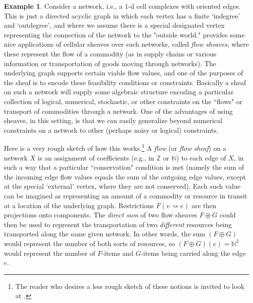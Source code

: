 \documentclass[a4paper]{book}
\theoremstyle{definition}
\newtheorem{example}{Example}[section]
\theoremstyle{definition}
\theoremstyle{definition}
\theoremstyle{theorem}
\theoremstyle{definition}
\begin{document}
\begin{example} 
Consider a network, i.e., a 1-d cell complexes with oriented edges. This is just a directed acyclic graph in which each vertex has a finite `indegree' and `outdegree', and where we assume there is a special designated vertex representing the connection of the network to the "outside world." \cite{ghrist_elementary_2014} provides some nice applications of cellular sheaves over such networks, called \textit{flow sheaves}, where these represent the flow of a commodity (as in supply chains or various information or transportation of goods moving through networks). The underlying graph supports certain viable flow values, and one of the purposes of the sheaf is to encode these feasibility conditions or constraints. Basically a sheaf on such a network will supply some algebraic structure encoding a particular collection of logical, numerical, stochastic, or other constraints on the ``flows" or transport of commodities through a network. One of the advantages of using sheaves, in this setting, is that we can easily generalize beyond numerical constraints on a network to other (perhaps noisy or logical) constraints. \par 
Here is a very rough sketch of how this works.\footnote{The reader who desires a less rough sketch of these notions is invited to look at \cite{ghrist_elementary_2014}.} A \textit{flow} (or \textit{flow sheaf}) on a network $X$ is an assignment of coefficients (e.g., in $\mathbb{Z}$ or $\mathbb{N}$) to each edge of $X$, in such a way that a particular ``conservation" condition is met (namely the sum of the incoming edge flow values equals the sum of the outgoing edge values, except at the special `external' vertex, where they are not conserved). Each such value can be imagined as representing an amount of a commodity or resource in transit at a location of the underlying graph. Restrictions $F(v \rightsquigarrow e)$ are then projections onto components. The \textit{direct sum} of two flow sheaves $F \oplus G$ could then be used to represent the transportation of two \textit{different} resources being transported along the same given network. In other words, the sum $(F \oplus G)$ would represent the number of both sorts of resources, so $(F \oplus G)(e) = \mathbb{N}^2$ would represent the number of $F$-items and $G$-items being carried along the edge $e$. 
\end{example}
\end{document}
